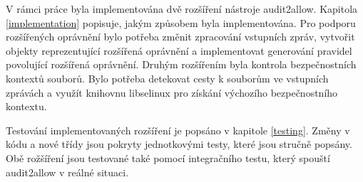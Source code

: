 V rámci práce byla implementována dvě rozšíření nástroje audit2allow. Kapitola
\ref{implementation} popisuje, jakým způsobem byla implementována. Pro podporu
rozšířených oprávnění bylo potřeba změnit zpracování vstupních zpráv, vytvořit
objekty reprezentující rozšířená oprávnění a implementovat generování pravidel
povolující rozšířená oprávnění. Druhým rozšířením byla kontrola bezpečnostních
kontextů souborů. Bylo potřeba detekovat cesty k souborům ve vstupních zprávách
a využít knihovnu libselinux pro získání výchozího bezpečnostního kontextu.

Testování implementovaných rozšíření je popsáno v kapitole \ref{testing}. Změny
v kódu a nové třídy jsou pokryty jednotkovými testy, které jsou stručně popsány.
Obě rožšíření jsou testované také pomocí integračního testu, který spouští
audit2allow v reálné situaci.

